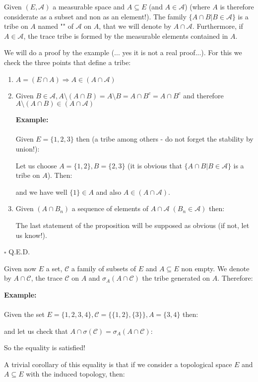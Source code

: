 	\begin{theorem}
	Given $(E, \mathcal{A})$ a measurable space and $A\subseteq E$ (and $A\in \mathcal{A}$) (where $A$ is therefore considerate as a subset and non as an element!). The family $\{A\cap B| B\in \mathcal{A}\}$ is a tribe on $A$ named "" of $\mathcal{A}$ on $A$, that we will denote by $A\cap \mathcal{A}$. Furthermore, if $A\in \mathcal{A}$, the trace tribe is formed by the measurable elements contained in $A$.
	\end{theorem}
	\begin{dem}
	We will do a proof by the example (... yes it is not a real proof...). For this we check the three points that define a tribe:
	\begin{enumerate}
		\item $A=(E\cap A) \Rightarrow A\in (A\cap \mathcal{A})$
		
		\item Given $B\in\mathcal{A},A \setminus (A\cap B)=A\setminus B=A \cap B^c=A \cap B^c$ and therefore $A\setminus (A\cap B)\in (A\cap \mathcal{A})$
		\begin{tcolorbox}[colframe=black,colback=white,sharp corners]
		\textbf{{\Large {}}Example:}\\\\
		Given $E=\{1,2,3\}$ then (a tribe among others - do not forget the stability by union!):
		
		Let us choose $A=\{1,2\},B=\{2,3\}$ (it is obvious that $\{A\cap B|B\in \mathcal{A}\}$ is a tribe on $A$). Then:
		
		and we have well $\{1\}\in A$ and also $A\in (A\cap \mathcal{A})$.
		\end{tcolorbox}
		
		\item Given $(A\cap B_n)$ a sequence of elements of $A\cap \mathcal{A}\; (B_n\in \mathcal{A})$ then:
		
		The last statement of the proposition will be supposed as obvious (if not, let us know!).
	\end{enumerate}
	\begin{flushright}
		$\square$  Q.E.D.
	\end{flushright}
	\end{dem}
	Given now $E$ a set, $\mathcal{C}$ a family of subsets of $E$ and $A\subseteq E$ non empty. We denote by $A\cap \mathcal{C}$, the trace $\mathcal{C}$ on $A$ and $\sigma_A(A\cap \mathcal{C})$ the tribe generated on $A$. Therefore:
	
	\begin{tcolorbox}[colframe=black,colback=white,sharp corners]
	\textbf{{\Large {}}Example:}\\\\
	Given the set $E=\{1,2,3,4\},\mathcal{C}=\{\{1,2\},\{3\}\},A=\{3,4\}$ then:
	
	and let us check that $A\cap \sigma(\mathcal{C})=\sigma_A(A\cap \mathcal{C})$:
	
	So the equality is satisfied!
	\end{tcolorbox}
	A trivial corollary of this equality is that if we consider a topological space $ E$ and $A\subseteq E$ with the induced topology, then:
	

